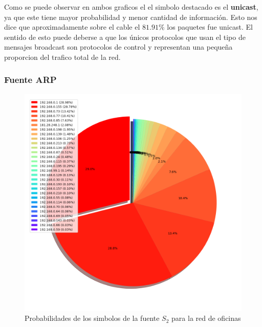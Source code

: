 Como se puede observar en ambos graficos el el simbolo 
destacado es el \textbf{unicast}, ya que este tiene mayor probabilidad
y menor cantidad de información. Esto nos dice que aproximadamente
sobre el cable el $81.91\%$ los paquetes fue unicast.
El sentido de esto puede deberse a que los únicos protocolos que
usan el tipo de mensajes broadcast son protocolos de control y representan
una pequeña proporcion del trafico total de la red.

\clearpage

\subsubsection{Fuente ARP}

\begin{figure}
\centering
 \includegraphics[scale=0.4]{../plots/trabajo_s2_probabilidades.png}
 \caption{Probabilidades de los simbolos de la fuente $S_2$ para la red de oficinas}
\end{figure}

